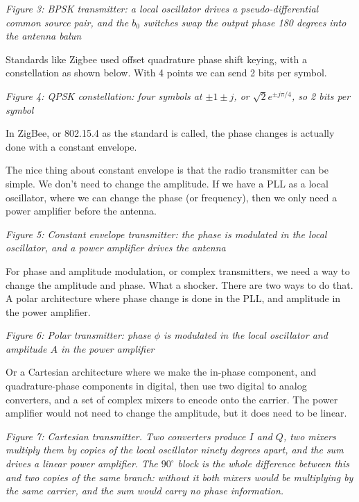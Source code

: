 \emph{Figure 3: BPSK transmitter: a local oscillator drives a
pseudo-differential common source pair, and the \(b_0\) switches swap
the output phase 180 degrees into the antenna balun}

Standards like Zigbee used offset quadrature phase shift keying, with a
constellation as shown below. With 4 points we can send 2 bits per
symbol.


{
\centering
{}
}

\emph{Figure 4: QPSK constellation: four symbols at \(\pm 1 \pm j\), or
\(\sqrt{2}e^{\pm j\pi/4}\), so 2 bits per symbol}

In ZigBee, or 802.15.4 as the standard is called, the phase changes is
actually done with a constant envelope.

The nice thing about constant envelope is that the radio transmitter can
be simple. We don't need to change the amplitude. If we have a PLL as a
local oscillator, where we can change the phase (or frequency), then we
only need a power amplifier before the antenna.


{
\centering
{}
}

\emph{Figure 5: Constant envelope transmitter: the phase is modulated in
the local oscillator, and a power amplifier drives the antenna}

For phase and amplitude modulation, or complex transmitters, we need a
way to change the amplitude and phase. What a shocker. There are two
ways to do that. A polar architecture where phase change is done in the
PLL, and amplitude in the power amplifier.


{
\centering
{}
}

\emph{Figure 6: Polar transmitter: phase \(\phi\) is modulated in the
local oscillator and amplitude \(A\) in the power amplifier}

Or a Cartesian architecture where we make the in-phase component, and
quadrature-phase components in digital, then use two digital to analog
converters, and a set of complex mixers to encode onto the carrier. The
power amplifier would not need to change the amplitude, but it does need
to be linear.


{
\centering
{}
}

\emph{Figure 7: Cartesian transmitter. Two converters produce \(I\) and
\(Q\), two mixers multiply them by copies of the local oscillator ninety
degrees apart, and the sum drives a linear power amplifier. The
\(90^\circ\) block is the whole difference between this and two copies
of the same branch: without it both mixers would be multiplying by the
same carrier, and the sum would carry no phase information.}

